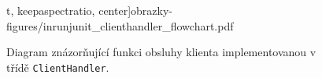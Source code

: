 \begin{figure}[h]
t, keepaspectratio, center]{obrazky-figures/inrunjunit_clienthandler_flowchart.pdf}
	  \caption{Diagram znázorňující funkci obsluhy klienta implementovanou v třídě \texttt{ClientHandler}.}
	  \label{fig:clientHandler_flowchart}
	\end{figure}
	
